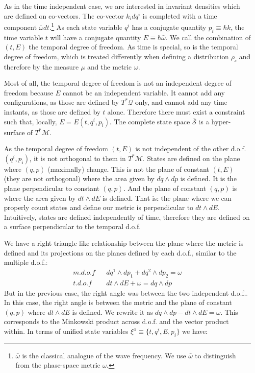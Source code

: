 \documentclass[aps,pra,10pt,twocolumn,floatfix,nofootinbib]{revtex4-1}
\numberwithin{equation}{section}
\theoremstyle{definition}
\begin{document}
As in the time independent case, we are interested in invariant densities which are defined on co-vectors. The co-vector $k_i dq^i$ is completed with a time component $\bar{\omega} dt$.\footnote{$\bar{\omega}$ is the classical analogue of the wave frequency. We use $\bar{\omega}$ to distinguish from the phase-space metric $\omega$.} As each state variable $q^i$ has a conjugate quantity $p_i\equiv \hbar k$, the time variable $t$ will have a conjugate quantity $E\equiv\hbar\bar{\omega}$. We call the combination of $(t, E)$ the temporal degree of freedom. As time is special, so is the temporal degree of freedom, which is treated differently when defining a distribution $\rho_\mathcal{c}$ and therefore by the measure $\mu$ and the metric $\omega$.

Most of all, the temporal degree of freedom is not an independent degree of freedom because $E$ cannot be an independent variable. It cannot add any configurations, as those are defined by $T^*\mathcal{Q}$ only, and cannot add any time instants, as those are defined by $t$ alone. Therefore there must exist a constraint such that, locally, $E=E(t,q^i,p_i)$. The complete state space $\bar{\mathcal{S}}$ is a hyper-surface of $T^*\mathcal{M}$.

As the temporal degree of freedom $(t, E)$ is not independent of the other d.o.f. $(q^i, p_i)$, it is not orthogonal to them in $T^*\mathcal{M}$. States are defined on the plane where $( q, p )$ (maximally) change. This is not the plane of constant $( t, E )$ (they are not orthogonal) where the area given by $dq \wedge dp$ is defined. It is the plane perpendicular to constant $( q, p )$. And the plane of constant $( q, p )$ is where the area given by $dt \wedge dE$ is defined. That is: the plane where we can properly count states and define our metric is perpendicular to $dt \wedge dE$. Intuitively, states are defined independently of time, therefore they are defined on a surface perpendicular to the temporal d.o.f.

We have a right triangle-like relationship between the plane where the metric is defined and its projections on the planes defined by each d.o.f., similar to the multiple d.o.f.:
\begin{align*}
m.d.o.f \;\;\; &dq^1 \wedge dp_1 + dq^2 \wedge dp_2 = \omega \\
t.d.o.f \;\;\; &dt \wedge dE + \omega = dq \wedge dp
\end{align*}
But in the previous case, the right angle was between the two independent d.o.f.. In this case, the right angle is between the metric and the plane of constant $(q, p)$ where $dt \wedge dE$ is defined. We rewrite it as $dq \wedge dp - dt \wedge dE = \omega$. This corresponds to the Minkowski product across d.o.f. and the vector product within. In terms of unified state variables $\xi^a\equiv \{t, q^i, E, p_i\}$ we have:
\end{document}
